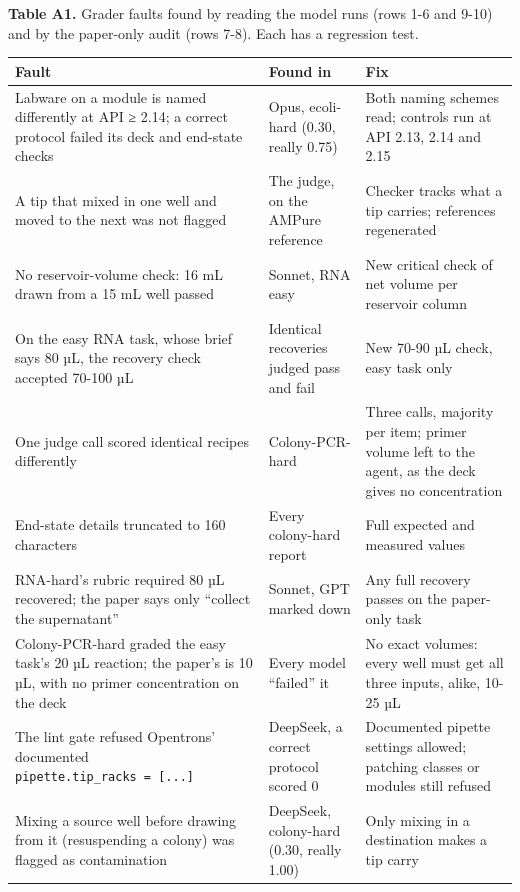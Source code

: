 \documentclass[
]{article}
\newcounter{none} %
\begin{document}
\textbf{Table A1.} Grader faults found by reading the model runs (rows
1-6 and 9-10) and by the paper-only audit (rows 7-8). Each has a
regression test.

{\def\LTcaptype{none} %
\begin{longtable}[]{@{}
  >{\raggedright\arraybackslash}p{}
  >{\raggedright\arraybackslash}p{}
  >{\raggedright\arraybackslash}p{}@{}}
\toprule\noalign{}
\begin{minipage}[b]{\linewidth}\raggedright
Fault
\end{minipage} & \begin{minipage}[b]{\linewidth}\raggedright
Found in
\end{minipage} & \begin{minipage}[b]{\linewidth}\raggedright
Fix
\end{minipage} \\
\midrule\noalign{}
\endhead
\bottomrule\noalign{}
\endlastfoot
Labware on a module is named differently at API ≥ 2.14; a correct
protocol failed its deck and end-state checks & Opus, ecoli-hard (0.30,
really 0.75) & Both naming schemes read; controls run at API 2.13, 2.14
and 2.15 \\
A tip that mixed in one well and moved to the next was not flagged & The
judge, on the AMPure reference & Checker tracks what a tip carries;
references regenerated \\
No reservoir-volume check: 16 mL drawn from a 15 mL well passed &
Sonnet, RNA easy & New critical check of net volume per reservoir
column \\
On the easy RNA task, whose brief says 80 µL, the recovery check
accepted 70-100 µL & Identical recoveries judged pass and fail & New
70-90 µL check, easy task only \\
One judge call scored identical recipes differently & Colony-PCR-hard &
Three calls, majority per item; primer volume left to the agent, as the
deck gives no concentration \\
End-state details truncated to 160 characters & Every colony-hard report
& Full expected and measured values \\
RNA-hard's rubric required 80 µL recovered; the paper says only
``collect the supernatant'' & Sonnet, GPT marked down & Any full
recovery passes on the paper-only task \\
Colony-PCR-hard graded the easy task's 20 µL reaction; the paper's is 10
µL, with no primer concentration on the deck & Every model ``failed'' it
& No exact volumes: every well must get all three inputs, alike, 10-25
µL \\
The lint gate refused Opentrons' documented
\texttt{pipette.tip\_racks\ =\ {[}...{]}} & DeepSeek, a correct protocol
scored 0 & Documented pipette settings allowed; patching classes or
modules still refused \\
Mixing a source well before drawing from it (resuspending a colony) was
flagged as contamination & DeepSeek, colony-hard (0.30, really 1.00) &
Only mixing in a destination makes a tip carry \\
\end{longtable}
}
\end{document}
